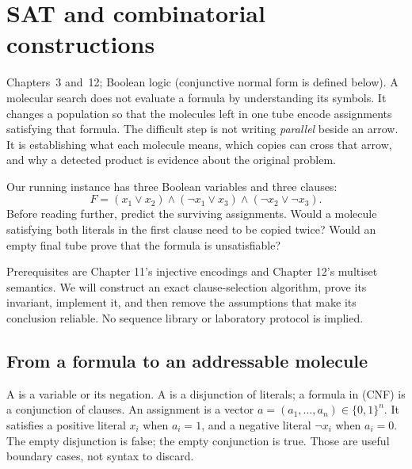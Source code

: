 \chapter{SAT and combinatorial constructions}
\label{ch:sat}
{Chapters~3 and~12; Boolean logic (conjunctive normal form is defined below).}
A molecular search does not evaluate a formula by understanding its symbols.
It changes a population so that the molecules left in one tube encode
assignments satisfying that formula. The difficult step is not writing
\emph{parallel} beside an arrow. It is establishing what each molecule means,
which copies can cross that arrow, and why a detected product is evidence
about the original problem.

Our running instance has three Boolean variables and three clauses:
\begin{equation}
 F=(x_1\lor x_2)\land(\neg x_1\lor x_3)
       \land(\neg x_2\lor\neg x_3).
 \label{eq:formula}
\end{equation}
Before reading further, predict the surviving assignments. Would a molecule
satisfying both literals in the first clause need to be copied twice? Would
an empty final tube prove that the formula is unsatisfiable?

Prerequisites are Chapter 11's injective encodings and Chapter 12's multiset
semantics. We will construct an exact clause-selection algorithm, prove its
invariant, implement it, and then remove the assumptions that make its
conclusion reliable. No sequence library or laboratory protocol is implied.

\section{From a formula to an addressable molecule}
A  is a variable or its negation. A  is a
disjunction of literals; a formula in  (CNF) is
a conjunction of clauses. An assignment is a vector
$a=(a_1,\ldots,a_n)\in\{0,1\}^n$. It satisfies a positive literal $x_i$
when $a_i=1$, and a negative literal $\neg x_i$ when $a_i=0$.
The empty disjunction is false; the empty conjunction is true. Those are
useful boundary cases, not syntax to discard.

